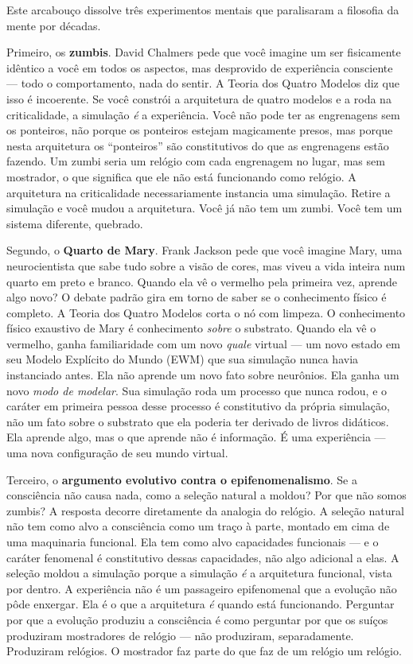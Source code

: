 \documentclass[11pt, twoside, openright]{book}
\begin{document}
Este arcabouço dissolve três experimentos mentais que paralisaram a filosofia da mente por décadas.

Primeiro, os \textbf{zumbis}. David Chalmers pede que você imagine um ser fisicamente idêntico a você em todos os aspectos, mas desprovido de experiência consciente --- todo o comportamento, nada do sentir. A Teoria dos Quatro Modelos diz que isso é incoerente. Se você constrói a arquitetura de quatro modelos e a roda na criticalidade, a simulação \textit{é} a experiência. Você não pode ter as engrenagens sem os ponteiros, não porque os ponteiros estejam magicamente presos, mas porque nesta arquitetura os ``ponteiros'' são constitutivos do que as engrenagens estão fazendo. Um zumbi seria um relógio com cada engrenagem no lugar, mas sem mostrador, o que significa que ele não está funcionando como relógio. A arquitetura na criticalidade necessariamente instancia uma simulação. Retire a simulação e você mudou a arquitetura. Você já não tem um zumbi. Você tem um sistema diferente, quebrado.

Segundo, o \textbf{Quarto de Mary}. Frank Jackson pede que você imagine Mary, uma neurocientista que sabe tudo sobre a visão de cores, mas viveu a vida inteira num quarto em preto e branco. Quando ela vê o vermelho pela primeira vez, aprende algo novo? O debate padrão gira em torno de saber se o conhecimento físico é completo. A Teoria dos Quatro Modelos corta o nó com limpeza. O conhecimento físico exaustivo de Mary é conhecimento \textit{sobre} o substrato. Quando ela vê o vermelho, ganha familiaridade com um novo \textit{quale} virtual --- um novo estado em seu Modelo Explícito do Mundo (EWM) que sua simulação nunca havia instanciado antes. Ela não aprende um novo fato sobre neurônios. Ela ganha um novo \textit{modo de modelar}. Sua simulação roda um processo que nunca rodou, e o caráter em primeira pessoa desse processo é constitutivo da própria simulação, não um fato sobre o substrato que ela poderia ter derivado de livros didáticos. Ela aprende algo, mas o que aprende não é informação. É uma experiência --- uma nova configuração de seu mundo virtual.

Terceiro, o \textbf{argumento evolutivo contra o epifenomenalismo}. Se a consciência não causa nada, como a seleção natural a moldou? Por que não somos zumbis? A resposta decorre diretamente da analogia do relógio. A seleção natural não tem como alvo a consciência como um traço à parte, montado em cima de uma maquinaria funcional. Ela tem como alvo capacidades funcionais --- e o caráter fenomenal é constitutivo dessas capacidades, não algo adicional a elas. A seleção moldou a simulação porque a simulação \textit{é} a arquitetura funcional, vista por dentro. A experiência não é um passageiro epifenomenal que a evolução não pôde enxergar. Ela é o que a arquitetura \textit{é} quando está funcionando. Perguntar por que a evolução produziu a consciência é como perguntar por que os suíços produziram mostradores de relógio --- não produziram, separadamente. Produziram relógios. O mostrador faz parte do que faz de um relógio um relógio.
\end{document}
